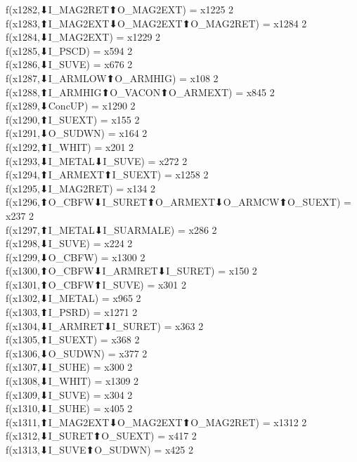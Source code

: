 f(x1282,⬇I_MAG2RET⬆O_MAG2EXT) = x1225 {2} \\
f(x1283,⬆I_MAG2EXT⬇O_MAG2EXT⬆O_MAG2RET) = x1284 {2} \\
f(x1284,⬇I_MAG2EXT) = x1229 {2} \\
f(x1285,⬇I_PSCD) = x594 {2} \\
f(x1286,⬇I_SUVE) = x676 {2} \\
f(x1287,⬇I_ARMLOW⬆O_ARMHIG) = x108 {2} \\
f(x1288,⬆I_ARMHIG⬆O_VACON⬆O_ARMEXT) = x845 {2} \\
f(x1289,⬇ConcUP) = x1290 {2} \\
f(x1290,⬆I_SUEXT) = x155 {2} \\
f(x1291,⬇O_SUDWN) = x164 {2} \\
f(x1292,⬆I_WHIT) = x201 {2} \\
f(x1293,⬇I_METAL⬇I_SUVE) = x272 {2} \\
f(x1294,⬆I_ARMEXT⬆I_SUEXT) = x1258 {2} \\
f(x1295,⬇I_MAG2RET) = x134 {2} \\
f(x1296,⬆O_CBFW⬇I_SURET⬆O_ARMEXT⬇O_ARMCW⬆O_SUEXT) = x237 {2} \\
f(x1297,⬆I_METAL⬇I_SUARMALE) = x286 {2} \\
f(x1298,⬇I_SUVE) = x224 {2} \\
f(x1299,⬇O_CBFW) = x1300 {2} \\
f(x1300,⬆O_CBFW⬇I_ARMRET⬇I_SURET) = x150 {2} \\
f(x1301,⬆O_CBFW⬆I_SUVE) = x301 {2} \\
f(x1302,⬇I_METAL) = x965 {2} \\
f(x1303,⬆I_PSRD) = x1271 {2} \\
f(x1304,⬇I_ARMRET⬇I_SURET) = x363 {2} \\
f(x1305,⬆I_SUEXT) = x368 {2} \\
f(x1306,⬇O_SUDWN) = x377 {2} \\
f(x1307,⬇I_SUHE) = x300 {2} \\
f(x1308,⬇I_WHIT) = x1309 {2} \\
f(x1309,⬇I_SUVE) = x304 {2} \\
f(x1310,⬇I_SUHE) = x405 {2} \\
f(x1311,⬆I_MAG2EXT⬇O_MAG2EXT⬆O_MAG2RET) = x1312 {2} \\
f(x1312,⬇I_SURET⬆O_SUEXT) = x417 {2} \\
f(x1313,⬇I_SUVE⬆O_SUDWN) = x425 {2} \\
